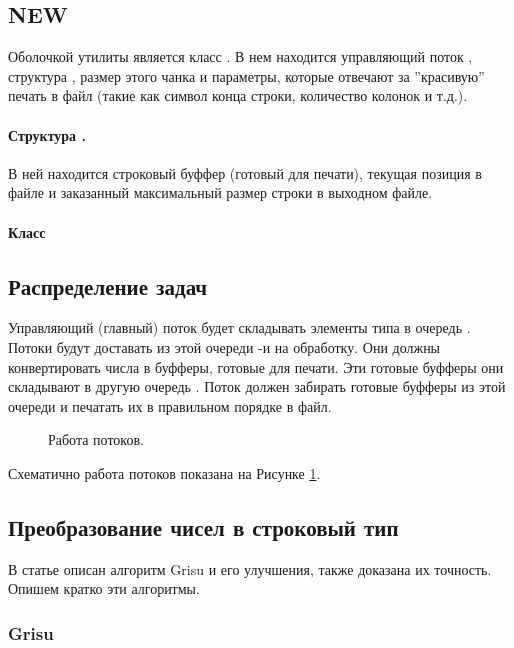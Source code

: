 \documentclass[a4paper, 12pt, twoside]{article}
\begin{document}
\subsection{NEW}
Оболочкой утилиты является класс \texttt{}. 
В нем находится управляющий поток \texttt{}, структура \texttt{}, размер этого чанка и параметры, которые отвечают за ''красивую'' печать в файл (такие как символ конца строки, количество колонок и т.д.).

\paragraph{Структура \texttt{}.} В ней находится строковый буффер (готовый для печати), текущая позиция в файле и заказанный максимальный размер строки в выходном файле.

\paragraph{Класс}


\subsection{Распределение задач}
Управляющий (главный) поток будет складывать элементы типа \texttt{} в очередь \texttt{}.
Потоки \texttt{} будут доставать из этой очереди \texttt{}-и на обработку.
Они должны конвертировать числа в буфферы, готовые для печати.
Эти готовые буфферы \texttt{} они складывают в другую очередь \texttt{}.
Поток \texttt{} должен забирать готовые буфферы из этой очереди и печатать их в правильном порядке в файл.
\begin{figure}[h!]
\def\svgwidth{430pt}
  
  \caption{Работа потоков.} \label{draw}
\end{figure}

Схематично работа потоков показана на Рисунке \ref{draw}.

\subsection{Преобразование чисел в строковый тип}
В статье \cite{1} описан алгоритм \textsf{Grisu} и его улучшения, также доказана их точность.
Опишем кратко эти алгоритмы.
\subsubsection{\textsf{Grisu}}
\end{document}
